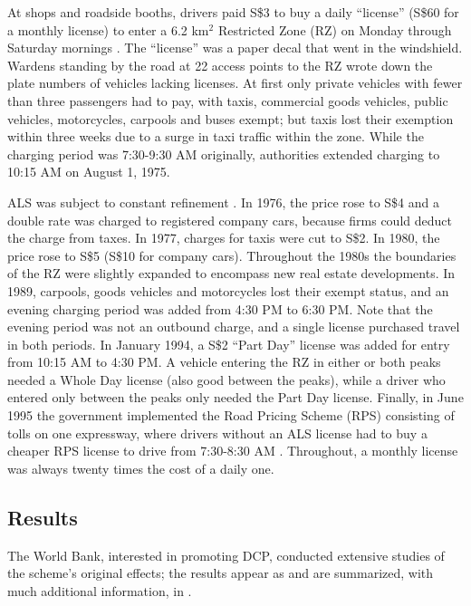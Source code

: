 At shops and roadside booths, drivers paid S\$3 to buy a daily ``license'' (S\$60 for a monthly license) to enter a 6.2 km$^{2}$ Restricted Zone (RZ) on Monday through Saturday mornings \citep{WatsonHolland1978}. The ``license'' was a paper decal that went in the windshield. Wardens standing by the road at 22 access points to the RZ wrote down the plate numbers of vehicles lacking licenses. At first only private vehicles with fewer than three passengers had to pay, with taxis, commercial goods vehicles, public vehicles, motorcycles, carpools and buses exempt; but taxis lost their exemption within three weeks due to a surge in taxi traffic within the zone. While the charging period was 7:30-9:30 AM originally, authorities  extended charging to 10:15 AM on August 1, 1975. 

ALS was subject to constant refinement \citep{Gomez-Ibanez1994, PhangToh1997}. In 1976, the price rose to S\$4 and a double rate was charged to registered company cars, because firms could deduct the charge from taxes. In 1977, charges for taxis were cut to S\$2. In 1980, the price rose to S\$5 (S\$10 for company cars). Throughout the 1980s the boundaries of the RZ were slightly expanded to encompass new real estate developments. In 1989, carpools, goods vehicles and motorcycles lost their exempt status, and an evening charging period was added from 4:30 PM to 6:30 PM. Note that the evening period was not an outbound charge, and a single license purchased travel in both periods. In January 1994, a S\$2 ``Part Day'' license was added for entry from 10:15 AM to 4:30 PM. A vehicle entering the RZ in either or both peaks needed a Whole Day license (also good between the peaks), while a driver who entered only between the peaks only needed the Part Day license. Finally, in June 1995 the government implemented the Road Pricing Scheme (RPS) consisting of tolls on one expressway, where drivers without an ALS license had to buy a cheaper RPS license to drive from 7:30-8:30 AM \citep{PhangToh2004}. Throughout, a monthly license was always twenty times the cost of a daily one.

\subsection{Results}

The World Bank, interested in promoting DCP, conducted extensive studies of the scheme's original effects; the results appear as \citet{WatsonHolland1978} and are summarized, with much additional information, in \citet{Gomez-Ibanez1994}. 

